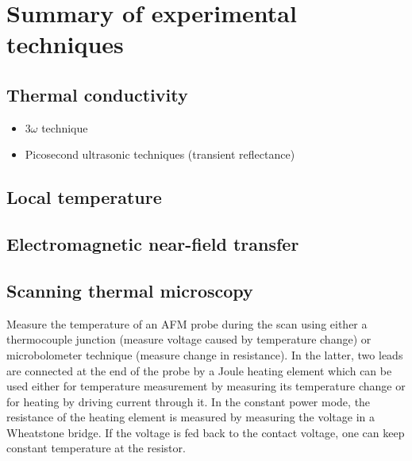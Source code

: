




\iffalse
\section{Summary of experimental techniques}

\subsection{Thermal conductivity}

\begin{itemize}
 \item $3\omega$ technique
 \item Picosecond ultrasonic techniques (transient reflectance)
\end{itemize}

\subsection{Local temperature}

\subsection{Electromagnetic near-field transfer}

\subsection{Scanning thermal microscopy}

Measure the temperature of an AFM probe during the scan using either a thermocouple junction (measure voltage caused by temperature change) or microbolometer technique (measure change in resistance). In the latter, two leads are connected at the end of the probe by a Joule heating element which can be used either for temperature measurement by measuring its temperature change or for heating by driving current through it. In the constant power mode, the resistance of the heating element is measured by measuring the voltage in a Wheatstone bridge. If the voltage is fed back to the contact voltage, one can keep constant temperature at the resistor. 


